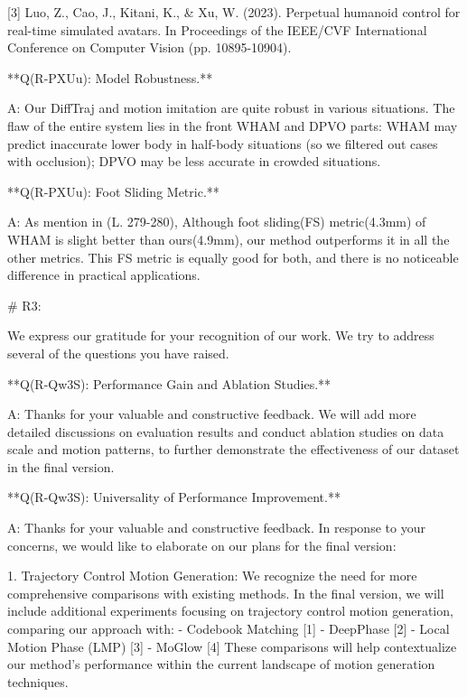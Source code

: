 [3] Luo, Z., Cao, J., Kitani, K., & Xu, W. (2023). Perpetual humanoid control for real-time simulated avatars. In Proceedings of the IEEE/CVF International Conference on Computer Vision (pp. 10895-10904).








**Q(R-PXUu): Model Robustness.**

A: Our DiffTraj and motion imitation are quite robust in various situations. The flaw of the entire system lies in the front WHAM and DPVO parts: WHAM may predict inaccurate lower body in half-body situations (so we filtered out cases with occlusion); DPVO may be less accurate in crowded situations.

**Q(R-PXUu): Foot Sliding Metric.**

A: As mention in (L. 279-280), Although foot sliding(FS) metric(4.3mm) of WHAM is slight better than ours(4.9mm), our method outperforms it in all the other metrics. This FS metric is equally good for both, and there is no noticeable difference in practical applications.







# R3:

We express our gratitude for your recognition of our work. We try to address several of the questions you have raised.

**Q(R-Qw3S): Performance Gain and Ablation Studies.**

A: Thanks for your valuable and constructive feedback. We will add more detailed discussions on evaluation results and conduct ablation studies on data scale and motion patterns, to further demonstrate the effectiveness of our dataset in the final version.


**Q(R-Qw3S): Universality of Performance Improvement.**

A: Thanks for your valuable and constructive feedback. In response to your concerns, we would like to elaborate on our plans for the final version:

1. Trajectory Control Motion Generation:
We recognize the need for more comprehensive comparisons with existing methods. In the final version, we will include additional experiments focusing on trajectory control motion generation, comparing our approach with:
    - Codebook Matching [1]
    - DeepPhase [2]
    - Local Motion Phase (LMP) [3]
    - MoGlow [4]
These comparisons will help contextualize our method's performance within the current landscape of motion generation techniques.

